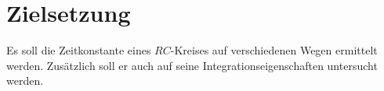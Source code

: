 \section{Zielsetzung}
\label{sec:Zielsetzung}
Es soll die Zeitkonstante eines $RC$-Kreises auf verschiedenen Wegen ermittelt werden.
Zusätzlich soll er auch auf seine Integrationseigenschaften untersucht werden.
